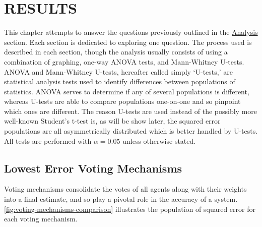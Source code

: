 %
%

\chapter{RESULTS}\label{ch:results}
This chapter attempts to answer the questions previously outlined in the
\hyperref[subsec:analysis]{Analysis} section.
Each section is dedicated to exploring one question.
The process used is described in each section, though the analysis usually consists
of using a combination of graphing, one-way ANOVA tests, and Mann-Whitney
U-tests.
ANOVA and Mann-Whitney U-tests, hereafter called simply `U-tests,' are statistical
analysis tests used to identify differences between populations of statistics.
ANOVA serves to determine if any of several populations is different, whereas U-tests
are able to compare populations one-on-one and so pinpoint which ones are different.
The reason U-tests are used instead of the possibly more well-known Student's t-test
is, as will be show later, the squared error populations are all asymmetrically
distributed which is better handled by U-tests.
All tests are performed with $\alpha = 0.05$ unless otherwise stated.


\section{Lowest Error Voting Mechanisms}\label{sec:lowest-error-voting-mechanism}
Voting mechanisms consolidate the votes of all agents along with their weights
into a final estimate, and so play a pivotal role in the accuracy of a system.
\autoref{fig:voting-mechanisms-comparison} illustrates the population of
squared error for each voting mechanism.

